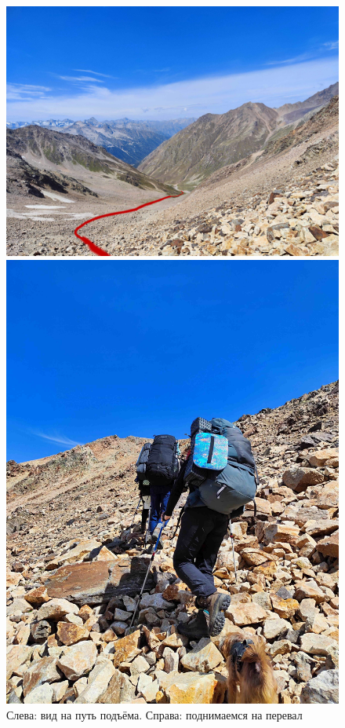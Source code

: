 \begin{figure}[h!]
	\centering
	\begin{minipage}[h]{0.52\linewidth}
		\includegraphics[width=0.99\linewidth]{../pics/IMG_20240830_105443}
	\end{minipage}
	\qquad
	\begin{minipage}[h]{0.29\linewidth}
		\includegraphics[width=0.99\linewidth]{../pics/IMG_20240830_105447}
	\end{minipage}
	\caption{Слева: вид на путь подъёма. Справа: поднимаемся на перевал}
	\label{fig:IMG_20240830_105443}
\end{figure}

